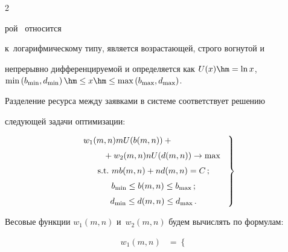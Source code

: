 \begin{multicols}{2}
\vspace*{-12pt}


\columnbreak





\noindent


рой~\cite{11-mos} относится 


к~логарифмическому типу, является возрастающей, строго вогнутой и 


непрерывно дифференцируемой и определяется как $U(x)\hm= \ln x$, $\min 


\left( b_{\min}, d_{\min}\right)\hm\leq x\hm\leq \max\left( b_{\max}, 


d_{\max}\right)$. 


  


  Разделение ресурса между заявками в системе соответствует решению 


следующей задачи оптимизации:


  \begin{equation}


  \left.


  \begin{array}{c}


  w_1(m,n) mU(b(m,n))+{}\hspace*{60pt}\\[6pt]


  \hspace*{20pt}{}+w_2(m,n) nU(d(m,n))\to \max\\[6pt]


  \mbox{s.t.}\ mb(m,n)+nd(m,n)=C\,;\\[6pt]


  b_{\min} \leq b(m,n)\leq b_{\max}\,;\\[6pt]


  d_{\min}\leq d(m,n)\leq d_{\max}\,.


  \end{array}


  \right\}


  \label{e4-mos}


  \end{equation}





Весовые функции $w_1(m,n)$ и~$w_2(m,n)$ будем вычислять по формулам: 


\begin{align*}


w_1(m,n) &=\begin{cases}



\end{cases}
\end{align*}
\end{multicols}
